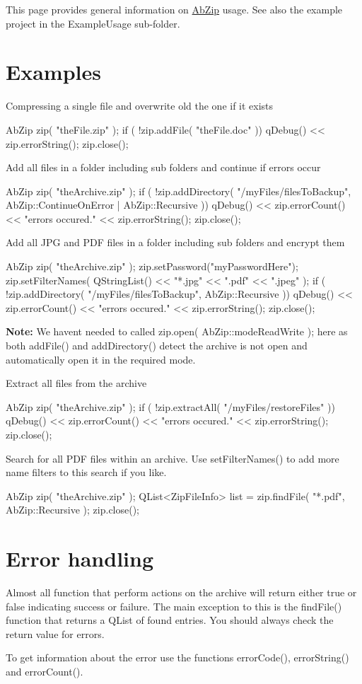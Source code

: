 This page provides general information on \hyperlink{class_ab_zip}{Ab\+Zip} usage. See also the example project in the \textquotesingle{}Example\+Usage\textquotesingle{} sub-\/folder.\hypertarget{usage_examples}{}\section{Examples}\label{usage_examples}
Compressing a single file and overwrite old the one if it exists \begin{DoxyVerb}   AbZip zip( "theFile.zip" );
   if ( !zip.addFile( "theFile.doc" ))
    qDebug() << zip.errorString();
   zip.close();
\end{DoxyVerb}


Add all files in a folder including sub folders and continue if errors occur \begin{DoxyVerb}   AbZip zip( "theArchive.zip" );
   if ( !zip.addDirectory( "/myFiles/filesToBackup", AbZip::ContinueOnError | AbZip::Recursive ))
    qDebug() << zip.errorCount() << "errors occured.\n" << zip.errorString();
   zip.close();
\end{DoxyVerb}


Add all J\+PG and P\+DF files in a folder including sub folders and encrypt them \begin{DoxyVerb}   AbZip zip( "theArchive.zip" );
   zip.setPassword("myPasswordHere");
   zip.setFilterNames( QStringList() << "*.jpg" << ".pdf" << ".jpeg" );
   if ( !zip.addDirectory( "/myFiles/filesToBackup", AbZip::Recursive ))
    qDebug() << zip.errorCount() << "errors occured.\n" << zip.errorString();
   zip.close();
\end{DoxyVerb}


{\bfseries Note\+:} We haven\textquotesingle{}t needed to called zip.\+open( Ab\+Zip\+::mode\+Read\+Write ); here as both add\+File() and add\+Directory() detect the archive is not open and automatically open it in the required mode.

Extract all files from the archive \begin{DoxyVerb}   AbZip zip( "theArchive.zip" );
   if ( !zip.extractAll( "/myFiles/restoreFiles" ))
    qDebug() << zip.errorCount() << "errors occured.\n" << zip.errorString();
   zip.close();
\end{DoxyVerb}


Search for all P\+DF files within an archive. Use set\+Filter\+Names() to add more name filters to this search if you like. \begin{DoxyVerb}   AbZip zip( "theArchive.zip" );
   QList<ZipFileInfo> list = zip.findFile( "*.pdf", AbZip::Recursive );
   zip.close();
\end{DoxyVerb}
\hypertarget{usage_error-handling}{}\section{Error handling}\label{usage_error-handling}
Almost all function that perform actions on the archive will return either {\ttfamily true} or {\ttfamily false} indicating success or failure. The main exception to this is the find\+File() function that returns a Q\+List of found entries. You should always check the return value for errors.

To get information about the error use the functions error\+Code(), error\+String() and error\+Count(). 